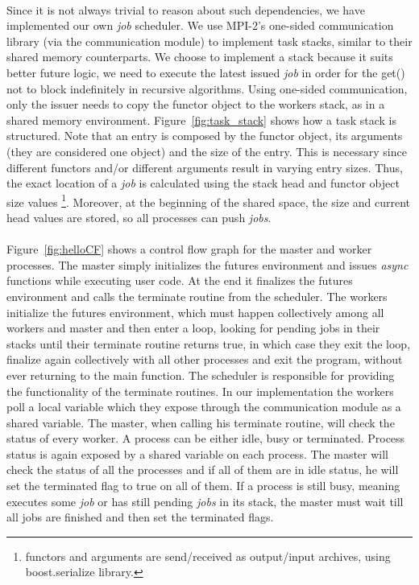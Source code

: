 \paragraph{}
Since it is not always trivial to reason about such dependencies, we have implemented our own \emph{job} 
scheduler.  We use MPI-2's one-sided communication library (via the communication module) to implement task
stacks, similar to their shared memory counterparts. We choose to implement a stack because it suits better
future logic, we need to execute the latest issued \emph{job} in order for the get() not to block indefinitely
in recursive algorithms.  Using one-sided communication, only the issuer needs to copy the functor object to
the workers stack, as in a shared memory environment.  Figure~\ref{fig:task_stack} 
shows how a task stack is structured.  
Note that an entry is composed by the functor object, its arguments (they are considered one object) and the 
size of the entry. This is necessary since different functors and/or different arguments result in 
varying entry sizes.
Thus, the exact location of a \emph{job} is calculated using the stack head and functor object size values 
\footnote{functors and arguments are send/received as output/input archives, using boost.serialize library.}.
Moreover, at the beginning of the shared space, the size and current head values are stored, so all processes
can push \emph{jobs}.

\paragraph{}
Figure~\ref{fig:helloCF} shows a control flow graph for the master and worker processes.  
The master simply initializes
the futures environment and issues \emph{async} functions while executing user code.  At the end it finalizes 
the futures environment and calls the terminate routine from the scheduler.  The workers initialize 
the futures environment, which must happen collectively among all workers and master and then enter a
loop, looking for pending jobs in their stacks until their terminate routine returns true, in which case
they exit the loop, finalize again collectively with all other processes and exit the program, without ever
returning to the main function.  The scheduler is responsible for providing the functionality of the terminate
routines.  In our implementation the workers poll a local variable which they expose through the communication
module as a shared variable.  The master, when calling his terminate routine, will check the status of every 
worker.  A process can be either idle, busy or terminated.  Process status is again exposed by a shared variable
on each process.  The master will check the status of all the processes and if all of them are in idle status, he
will set the terminated flag to true on all of them.  If a process is still busy, meaning executes some \emph{job}
or has still pending \emph{jobs} in its stack, the master must wait till all jobs are finished and then set the 
terminated flags.

